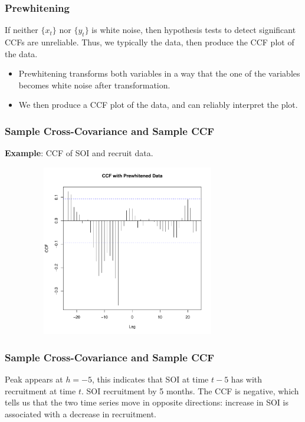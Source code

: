 \documentclass[%
xcolor=pdftex]{beamer}
\begin{document}
\begin{frame}
\frametitle{Prewhitening}

If neither $\{x_t\}$ nor $\{y_t\}$ is white noise, then hypothesis tests to detect significant CCFs are unreliable. Thus, we typically \underline{\hspace{20 mm}} the data, then produce the CCF plot of the data. 

\begin{itemize}

\item Prewhitening transforms both variables in a way that the one of the variables becomes white noise after transformation. 

\item We then produce a CCF plot of the data, and can reliably interpret the plot. 

\end{itemize}

\end{frame}

\begin{frame}
\frametitle{Sample Cross-Covariance and Sample CCF}

\textbf{Example}: CCF of SOI and recruit data.

\includegraphics[width=110mm, height=75mm]{ccf_soi.pdf}

\end{frame}

\begin{frame}
\frametitle{Sample Cross-Covariance and Sample CCF}

Peak appears at $h=-5$, this indicates that SOI at time $t-5$ has \underline{\hspace{35 mm}} with recruitment at time $t$. SOI \underline{\hspace{10 mm}} recruitment by 5 months. The CCF is negative, which tells us that the two time series move in opposite directions: increase in SOI is associated with a decrease in recruitment.

\end{frame}
\end{document}
